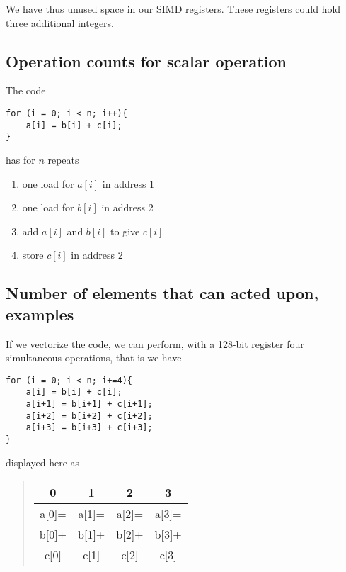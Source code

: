 \documentclass[%
oneside,                 %
final,                   %
10pt]{article}
\begin{document}
\noindent
We have thus unused space in our SIMD registers. These registers could hold three additional integers.


\subsection*{Operation counts for scalar operation}
The code
\begin{verbatim}
for (i = 0; i < n; i++){
    a[i] = b[i] + c[i];
}
\end{verbatim}
has for $n$ repeats
\begin{enumerate}
\item one load for $a[i]$ in address 1

\item one load for $b[i]$ in address 2

\item add $a[i]$ and $b[i]$ to give $c[i]$

\item store $c[i]$ in address 2
\end{enumerate}

\noindent
\subsection*{Number of elements that can acted upon, examples}
If we vectorize the code, we can perform, with a 128-bit register four simultaneous operations, that is
we have
\begin{verbatim}
for (i = 0; i < n; i+=4){
    a[i] = b[i] + c[i];
    a[i+1] = b[i+1] + c[i+1];
    a[i+2] = b[i+2] + c[i+2];
    a[i+3] = b[i+3] + c[i+3];
}
\end{verbatim}
displayed here as


\begin{quote}
\begin{tabular}{cccc}
\hline
\multicolumn{1}{c}{ 0 } & \multicolumn{1}{c}{ 1 } & \multicolumn{1}{c}{ 2 } & \multicolumn{1}{c}{ 3 } \\
\hline
a[0]= & a[1]= & a[2]= & a[3]= \\
\hline
b[0]+ & b[1]+ & b[2]+ & b[3]+ \\
\hline
c[0]  & c[1]  & c[2]  & c[3]  \\
\hline
\end{tabular}
\end{quote}
\end{document}
